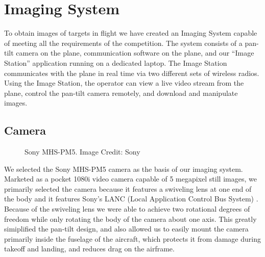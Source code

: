 \documentclass[pdftex,10pt,letter]{article}
\begin{document}
\section{Imaging System}

To obtain images of targets in flight we have created an Imaging System capable of meeting all the requirements of the competition.  The system consists of a pan-tilt camera on the plane, communication software on the plane, and our ``Image Station'' application running on a dedicated laptop.  The Image Station communicates with the plane in real time via two different sets of wireless radios.  Using the Image Station, the operator can view a live video stream from the plane, control the pan-tilt camera remotely, and download and manipulate images.

\subsection{Camera}

\begin{figure} [h!]
	\centering
	\caption{Sony MHS-PM5. Image Credit: Sony}
	\label{fig:camera}
\end{figure}

We selected the Sony MHS-PM5 camera as the basis of our imaging system. Marketed as a pocket 1080i video camera capable of 5 megapixel still images, we primarily selected the camera because it features a swiveling lens at one end of the body and it features Sony's LANC (Local Application Control Bus System) \cite{lanc}. Because of the swiveling lens we were able to achieve two rotational degrees of freedom while only rotating the body of the camera about one axis.  This greatly simiplified the pan-tilt design, and also allowed us to easily mount the camera primarily inside the fuselage of the aircraft, which protects it from damage during takeoff and landing, and reduces drag on the airframe. 
\end{document}
